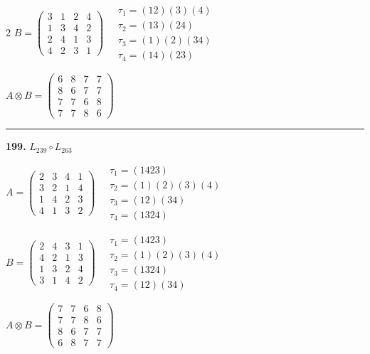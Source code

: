 \begin{multicols}{2}
$B = \begin{pmatrix} 3 & 1 & 2 & 4 \\ 1 & 3 & 4 & 2 \\ 2 & 4 & 1 & 3 \\ 4 & 2 & 3 & 1 \end{pmatrix} \quad \begin{matrix} \tau_{1}=(1 2)(3)(4) \\ \tau_{2}=(1 3)(2 4) \\ \tau_{3}=(1)(2)(3 4) \\ \tau_{4}=(1 4)(2 3) \end{matrix}$

$A \otimes B = \begin{pmatrix} 6 & 8 & 7 & 7 \\ 8 & 6 & 7 & 7 \\ 7 & 7 & 6 & 8 \\ 7 & 7 & 8 & 6 \end{pmatrix}$

\vspace{0.3em}
\hrule
\vspace{0.3em}

\noindent\textbf{199.} $L_{239} \circ L_{263}$

$A = \begin{pmatrix} 2 & 3 & 4 & 1 \\ 3 & 2 & 1 & 4 \\ 1 & 4 & 2 & 3 \\ 4 & 1 & 3 & 2 \end{pmatrix} \quad \begin{matrix} \tau_{1}=(1 4 2 3) \\ \tau_{2}=(1)(2)(3)(4) \\ \tau_{3}=(1 2)(3 4) \\ \tau_{4}=(1 3 2 4) \end{matrix}$

$B = \begin{pmatrix} 2 & 4 & 3 & 1 \\ 4 & 2 & 1 & 3 \\ 1 & 3 & 2 & 4 \\ 3 & 1 & 4 & 2 \end{pmatrix} \quad \begin{matrix} \tau_{1}=(1 4 2 3) \\ \tau_{2}=(1)(2)(3)(4) \\ \tau_{3}=(1 3 2 4) \\ \tau_{4}=(1 2)(3 4) \end{matrix}$

$A \otimes B = \begin{pmatrix} 7 & 7 & 6 & 8 \\ 7 & 7 & 8 & 6 \\ 8 & 6 & 7 & 7 \\ 6 & 8 & 7 & 7 \end{pmatrix}$


\end{multicols}
